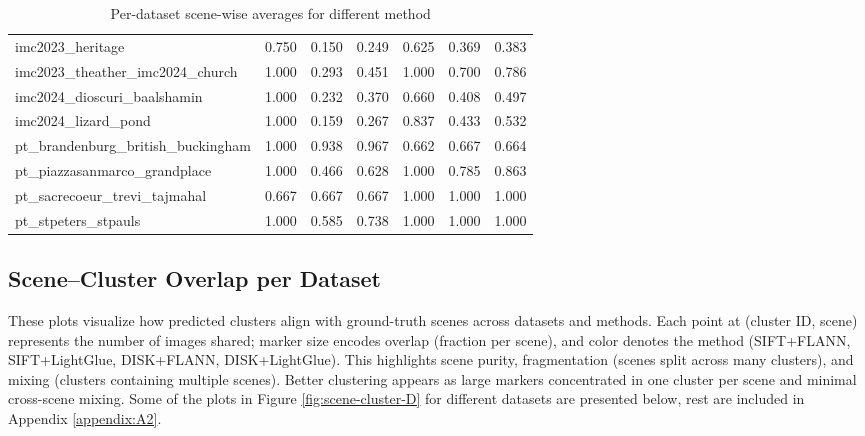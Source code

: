 \documentclass[report.tex]{subfiles}
\begin{document}
\begin{table}
\begin{tabular}{lrrrrrr}
imc2023\_heritage & 0.750 & 0.150 & 0.249 & 0.625 & 0.369 & 0.383 \\
imc2023\_theather\_imc2024\_church & 1.000 & 0.293 & 0.451 & 1.000 & 0.700 & 0.786 \\
imc2024\_dioscuri\_baalshamin & 1.000 & 0.232 & 0.370 & 0.660 & 0.408 & 0.497 \\
imc2024\_lizard\_pond & 1.000 & 0.159 & 0.267 & 0.837 & 0.433 & 0.532 \\
pt\_brandenburg\_british\_buckingham & 1.000 & 0.938 & 0.967 & 0.662 & 0.667 & 0.664 \\
pt\_piazzasanmarco\_grandplace & 1.000 & 0.466 & 0.628 & 1.000 & 0.785 & 0.863 \\
pt\_sacrecoeur\_trevi\_tajmahal & 0.667 & 0.667 & 0.667 & 1.000 & 1.000 & 1.000 \\
pt\_stpeters\_stpauls & 1.000 & 0.585 & 0.738 & 1.000 & 1.000 & 1.000 \\
\bottomrule
\end{tabular}
\caption{Per-dataset scene-wise averages for different method}
\label{tab:per-dataset-methods}
\end{table}


\subsection{Scene–Cluster Overlap per Dataset}
These plots visualize how predicted clusters align with ground-truth scenes across datasets and methods. Each point at (cluster ID, scene) represents the number of images shared; marker size encodes overlap (fraction per scene), and color denotes the method (SIFT+FLANN, SIFT+LightGlue, DISK+FLANN, DISK+LightGlue). This highlights scene purity, fragmentation (scenes split across many clusters), and mixing (clusters containing multiple scenes). Better clustering appears as large markers concentrated in one cluster per scene and minimal cross-scene mixing. Some of the plots in Figure \ref{fig:scene-cluster-D} for different datasets are presented below, rest are included in Appendix \ref{appendix:A2}.
\end{document}
